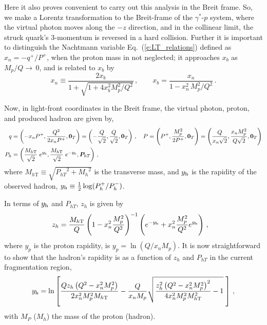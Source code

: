 \documentclass[final,3p,times,onecolumn,sort&compress,hidelinks]{elsarticle}
\newcommand{\xbj}{x_b}
\newcommand{\zh}{z_h}
\newcommand{\xn}{x_n}
\newcommand{\PhT}{\ensuremath{P_{hT}}}
\newcommand{\Tsc}[2]{#1_{#2\text{T}}}
\newcommand{\hady}{\ensuremath{y_{\rm h}}}
\newcommand{\hadpsc}{{\ensuremath{P_h}}}
\newcommand{\hadmass}{\ensuremath{M_h}}
\newcommand{\parz}[1]{\ensuremath{\left(#1\right)}}
\newcommand{\bea}{\begin{eqnarray}}
\newcommand{\eea}{\end{eqnarray}}
\begin{document}
 Here it also proves convenient to carry out this analysis in the Breit frame.
 So, we make a Lorentz transformation to  the Breit-frame of the  $\gamma^*$-$p$
 system, where the virtual photon moves along the $-z$ direction, and in the collinear limit, the struck quark's $3$-momentum is reversed in a hard collision.
  Further it is important to distinguish the Nachtmann variable Eq.~(\ref{e:LT_relations}) defined as $\xn=-q^+/P^+$, when the proton mass in not neglected; it approaches $\xbj$ as $M_p/Q\rightarrow\, 0$, and is related to $\xbj$ by
\begin{equation}
 \xn \equiv \frac{2 \xbj}{1 + \sqrt{1 + 4 \xbj^2 M_p^2/Q^2} }\,,
 \qquad 
 \xbj = \frac{\xn}{1 - \xn^2\,M_p^2/Q^2 }\, .
\label{eq:xn.xbj}
\end{equation}

Now, in light-front coordinates in the Breit frame, the virtual photon, proton, and produced hadron are given by,
\begin{align}
  q &{}= \parz{-\xn P^+,\frac{Q^2}{2 \xn P^+}, {\bf 0}_T }
       = \parz{-\frac{Q}{\sqrt{2}},\frac{Q}{\sqrt{2}},{\bf 0}_T }\, , \quad
  P {} = \parz{P^+,\frac{M_p^2}{2 P^+},{\bf 0}_T }
       = \parz{\frac{Q}{\xn \sqrt{2}},\frac{\xn M_p^2}{Q \sqrt{2} },{\bf 0}_T }\\
\hadpsc &{}= \parz{\frac{\Tsc{M}{h}}{\sqrt{2}} \;
		 e^{\hady},\frac{\Tsc{M}{h}}{\sqrt{2}} \;
		 e^{-\hady},{\bm P}_{hT} }\, ,
  \label{eq:hadmom} 
\end{align}
where  $\Tsc{M}{h} \equiv \sqrt{ \PhT^2+ \hadmass^2 }$ is the transverse mass, and  $\hady$ is the
rapidity of the observed hadron, $\hady\equiv \frac{1}{2}\log(P_h^+/P_h^-)$.

In terms of $\hady$ and $\PhT$, $\zh$ is given by
\begin{align}
\zh  &=  
   \frac{\Tsc{M}{h}}{Q} \parz{1-\xn^2 \frac{M_p^2}{Q^2}}^{-1} \parz{ e^{-\hady}  +
   \xn^2 \frac{M_p^2}{Q^2}  e^{\hady} }
   \, , 
\label{eq:z}
\end{align}%
where $y_p$ is the proton rapidity, is $y_p =  \ln \parz{Q/\xn M_p}$. It is 
now straightforward to show that the hadron's rapidity is as a function of $\zh$ and $\PhT$ in the current fragmentation region,
\bea
\hady =   \ln \left[\frac{Q \zh \left(Q^2-\xn^2 M_p^2\right)}{2 \xn^2 M_p^2
   \Tsc{M}{h} } - \frac{Q}{\xn M_p} \sqrt{\frac{\zh^2 \left(Q^2-\xn^2 M_p^2\right)^2}{4 \xn^2 M_p^2
   \Tsc{M}{h} ^2}- 1} \; \right] \, , 
\label{eq:rapvalue}
\eea
with $M_P$ ($M_h$) the mass of the proton (hadron).
\end{document}
